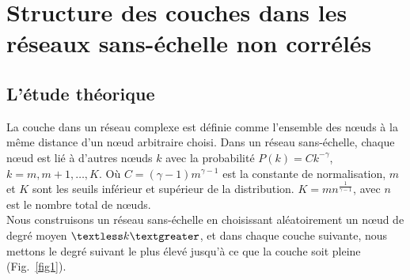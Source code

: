 \section{Structure des couches dans les réseaux sans-échelle non corrélés}
        \subsection{L'étude théorique}
La couche dans un réseau complexe est définie comme l'ensemble des nœuds à la même distance d'un nœud arbitraire choisi. Dans un réseau sans-échelle, chaque nœud est lié à d'autres nœuds $k$ avec la probabilité $P(k)=Ck^{-\gamma}$, $k=m, m + 1, \ldots, K$. Où $C=(\gamma-1)m^{\gamma-1}$ est la constante de normalisation, $m$ et $K$ sont les seuils inférieur et supérieur de la distribution. $K=mn^{\frac{1}{\gamma-1}}$, avec $n$ est le nombre total de nœuds. \\
Nous construisons un réseau sans-échelle en choisissant aléatoirement un nœud de degré moyen $\km$, et dans chaque couche suivante, nous mettons le degré suivant le plus élevé jusqu'à ce que la couche soit pleine (Fig.~\ref{fig1}).\\
